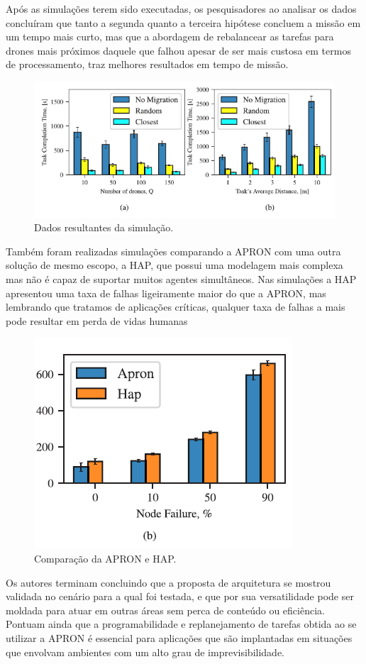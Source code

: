 \documentclass[12pt]{article}
\begin{document}
Após as simulações terem sido executadas, os pesquisadores ao analisar os dados concluíram que tanto a segunda quanto a terceira hipótese concluem a missão em um tempo mais curto, mas que a abordagem de rebalancear as tarefas para drones mais próximos daquele que falhou apesar de ser mais custosa em termos de processamento, traz melhores resultados em tempo de missão.

\begin{figure}[H]
    \includegraphics[width=\linewidth]{results_1.png}
    \caption{Dados resultantes da simulação.}
\end{figure}

Também foram realizadas simulações comparando a APRON com uma outra solução de mesmo escopo, a HAP, que possui uma modelagem mais complexa mas não é capaz de suportar muitos agentes simultâneos. Nas simulações a HAP apresentou uma taxa de falhas ligeiramente maior do que a APRON, mas lembrando que tratamos de aplicações críticas, qualquer taxa de falhas a mais pode resultar em perda de vidas humanas

\begin{figure}[H]
    \centering
    \includegraphics[width=0.5\linewidth]{apron_vs_hap.png}
    \caption{Comparação da APRON e HAP.}
\end{figure}

Os autores terminam concluindo que a proposta de arquitetura se mostrou validada no cenário para a qual foi testada, e que por sua versatilidade pode ser moldada para atuar em outras áreas sem perca de conteúdo ou eficiência. Pontuam ainda que a programabilidade e replanejamento de tarefas obtida ao se utilizar a APRON é essencial para aplicações que são implantadas em situações que envolvam ambientes com um alto grau de imprevisibilidade.
\end{document}
